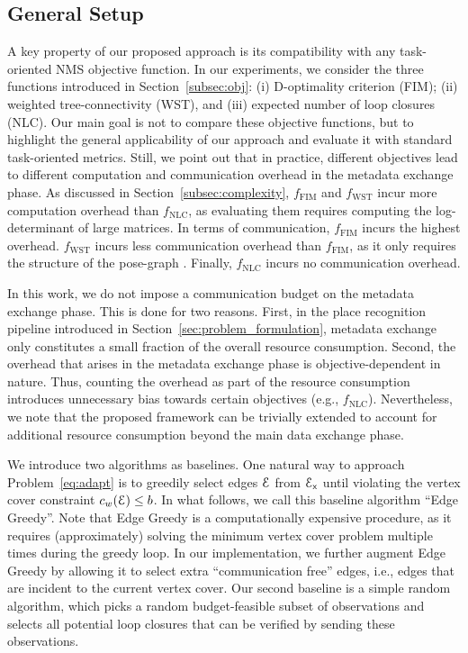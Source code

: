 \documentclass[conference]{IEEEtran}
\begin{document}
\subsection{General Setup} 
A key property of our proposed approach is its
compatibility with any task-oriented NMS objective function. In our experiments, we consider the three functions introduced in Section~\ref{subsec:obj}: (i) D-optimality criterion (FIM); (ii) weighted tree-connectivity (WST), and (iii) expected number of loop closures (NLC).
Our main goal is not to compare these objective functions, but to highlight the
general applicability of our approach and evaluate it with standard
task-oriented metrics. Still, we point out that in practice, different
objectives lead to different computation and communication overhead in the
metadata exchange phase. As discussed in Section~\ref{subsec:complexity},
$f_\text{FIM}$ and $f_\text{WST}$ incur more computation overhead than
$f_\text{NLC}$, as evaluating them requires computing the log-determinant of
large matrices. In terms of communication, $f_{\text{FIM}}$ incurs the highest
overhead. $f_{\text{WST}}$ incurs less communication overhead than $f_{\text{FIM}}$, as it only requires the structure of the pose-graph \cite{kasra18ijrr}. Finally, $f_{\text{NLC}}$ incurs no communication overhead. 

In this work, we do not impose a communication budget on the metadata exchange
phase. This is done for two reasons. First, in the place recognition pipeline
introduced in Section~\ref{sec:problem_formulation}, metadata exchange only
constitutes a small fraction of the overall resource consumption. Second, the
overhead that arises in the metadata exchange phase is objective-dependent in
nature. Thus, counting the overhead as part of the resource consumption
introduces unnecessary bias towards certain objectives (e.g., $f_\text{NLC}$).
Nevertheless, we note that the proposed framework can be trivially extended to
account for additional resource consumption beyond the main data exchange phase.

We introduce two algorithms as baselines. 
One natural way to approach Problem~\ref{eq:adapt} is to greedily select edges $\mathcal{E}$ from $\mathcal{E}_\mathsf{x}$ until violating the vertex cover constraint 
$c_w(\mathcal{E}) \leq b$. In what follows, we call this baseline algorithm ``Edge
Greedy''. 
Note that Edge Greedy is a computationally expensive procedure, as it requires (approximately) solving the minimum vertex cover problem multiple times during the greedy loop. 
In our implementation, we further augment Edge Greedy by allowing it to select extra ``communication free'' edges, i.e., edges that are incident to the current vertex cover. 
Our second baseline is a simple random algorithm, which picks a random budget-feasible subset of observations and selects all potential loop closures that can be verified by sending these observations.
\end{document}
